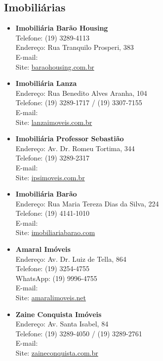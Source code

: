 \subsection{Imobiliárias}

\begin{itemize}
\item \textbf{Imobiliária Barão Housing}
  \\Telefone: (19) 3289-4113
  \\Endereço: Rua Tranquilo Prosperi, 383
  \\E-mail: 
  \\Site: \url{baraohousing.com.br}

\item \textbf{Imobiliária Lanza}
  \\Endereço: Rua Benedito Alves Aranha, 104
  \\Telefone: (19) 3289-1717 / (19) 3307-7155
  \\E-mail: 
  \\Site: \url{lanzaimoveis.com.br}

\item \textbf{Imobiliária Professor Sebastião}
  \\Endereço: Av. Dr. Romeu Tortima, 344
  \\Telefone: (19) 3289-2317
  \\E-mail: 
  \\Site: \url{ipsimoveis.com.br}

\item \textbf{Imobiliária Barão}
  \\Endereço: Rua Maria Tereza Dias da Silva, 224
  \\Telefone: (19) 4141-1010
  \\E-mail: 
  \\Site: \url{imobiliariabarao.com}

\item \textbf{Amaral Imóveis}
  \\Endereço: Av. Dr. Luiz de Tella, 864
  \\Telefone: (19) 3254-4755
  \\WhatsApp: (19) 9996-4755
  \\E-mail: 
  \\Site: \url{amaralimoveis.net}

\item \textbf{Zaine Conquista Imóveis}
  \\Endereço: Av. Santa Isabel, 84
  \\Telefone: (19) 3289-4050 / (19) 3289-2761
  \\E-mail: 
  \\Site: \url{zaineconquista.com.br}


\end{itemize}
